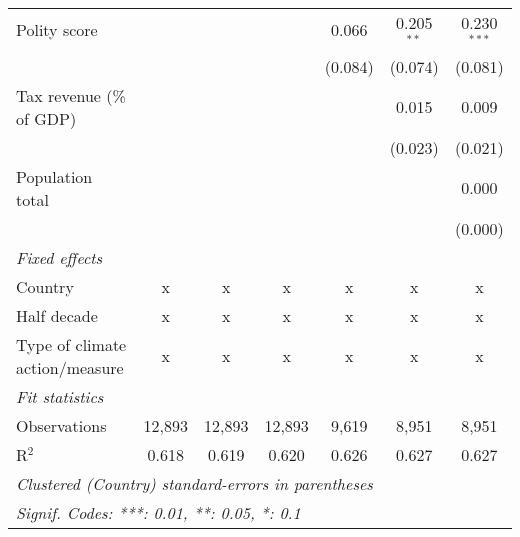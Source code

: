 \begin{tabular}{lcccccc}
   Polity score                                                         &         &                &                & 0.066          & 0.205$^{**}$   & 0.230$^{***}$\\   
                                                                        &         &                &                & (0.084)        & (0.074)        & (0.081)\\   
   Tax revenue (\% of GDP)                                              &         &                &                &                & 0.015          & 0.009\\   
                                                                        &         &                &                &                & (0.023)        & (0.021)\\   
   Population total                                                     &         &                &                &                &                & 0.000\\   
                                                                        &         &                &                &                &                & (0.000)\\   
   \emph{Fixed effects}\\
   Country                                                              & x       & x              & x              & x              & x              & x\\  
   Half decade                                                          & x       & x              & x              & x              & x              & x\\  
   Type of climate action/measure                                       & x       & x              & x              & x              & x              & x\\  
   \midrule \emph{Fit statistics}\\
   Observations                                                         & 12,893  & 12,893         & 12,893         & 9,619          & 8,951          & 8,951\\  
   R$^2$                                                                & 0.618   & 0.619          & 0.620          & 0.626          & 0.627          & 0.627\\  
   \midrule
   \multicolumn{7}{l}{\emph{Clustered (Country) standard-errors in parentheses}}\\
   \multicolumn{7}{l}{\emph{Signif. Codes: ***: 0.01, **: 0.05, *: 0.1}}\\
\end{tabular}
\par\endgroup


